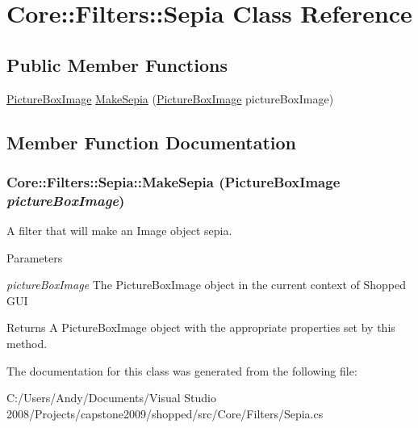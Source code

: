 \hypertarget{class_core_1_1_filters_1_1_sepia}{
\section{Core::Filters::Sepia Class Reference}
\label{class_core_1_1_filters_1_1_sepia}
}
\subsection*{Public Member Functions}
\begin{DoxyCompactItemize}
\item 
\hyperlink{class_core_1_1_images_1_1_picture_box_image}{PictureBoxImage} \hyperlink{class_core_1_1_filters_1_1_sepia_a3c44dc59672fcca27aecc21ace524417}{MakeSepia} (\hyperlink{class_core_1_1_images_1_1_picture_box_image}{PictureBoxImage} pictureBoxImage)
\end{DoxyCompactItemize}


\subsection{Member Function Documentation}
\hypertarget{class_core_1_1_filters_1_1_sepia_a3c44dc59672fcca27aecc21ace524417}{
\subsubsection[{MakeSepia}]{ Core::Filters::Sepia::MakeSepia ({\bf PictureBoxImage} {\em pictureBoxImage})}}
\label{class_core_1_1_filters_1_1_sepia_a3c44dc59672fcca27aecc21ace524417}
A filter that will make an Image object sepia.


\begin{DoxyParams}{Parameters}
\item[{\em pictureBoxImage}]The PictureBoxImage object in the current context of Shopped GUI \end{DoxyParams}
\begin{DoxyReturn}{Returns}
A PictureBoxImage object with the appropriate properties set by this method. 
\end{DoxyReturn}


The documentation for this class was generated from the following file:\begin{DoxyCompactItemize}
\item 
C:/Users/Andy/Documents/Visual Studio 2008/Projects/capstone2009/shopped/src/Core/Filters/Sepia.cs\end{DoxyCompactItemize}
